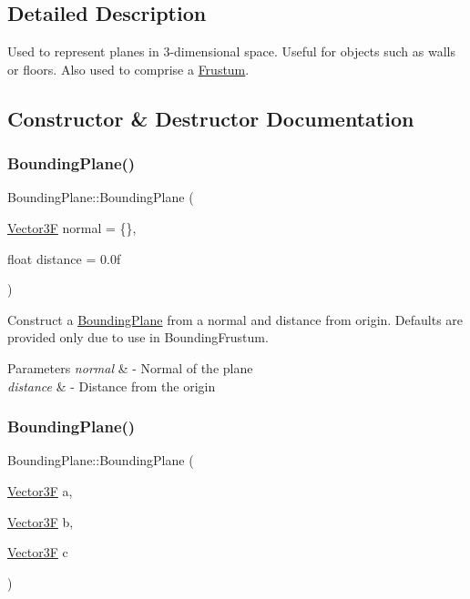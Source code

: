 \subsection{Detailed Description}
Used to represent planes in 3-\/dimensional space. Useful for objects such as walls or floors. Also used to comprise a \mbox{\hyperlink{class_frustum}{Frustum}}. 

\subsection{Constructor \& Destructor Documentation}
\mbox{\label{class_bounding_plane_ad25000eaea20874698ae4b40bb84fb41}} 
\subsubsection{\texorpdfstring{Bounding\+Plane()}{BoundingPlane()}\hspace{0.1cm}{\footnotesize\ttfamily [1/2]}}
{\footnotesize\ttfamily Bounding\+Plane\+::\+Bounding\+Plane (\begin{DoxyParamCaption}\item[{\mbox{\hyperlink{class_vector3}{Vector3F}}}]{normal = {\ttfamily \{\}},  }\item[{float}]{distance = {\ttfamily 0.0f} }\end{DoxyParamCaption})}

Construct a \mbox{\hyperlink{class_bounding_plane}{Bounding\+Plane}} from a normal and distance from origin. Defaults are provided only due to use in Bounding\+Frustum. 
\begin{DoxyParams}{Parameters}
{\em normal} & -\/ Normal of the plane \\
\hline
{\em distance} & -\/ Distance from the origin \\
\hline
\end{DoxyParams}
\mbox{\label{class_bounding_plane_a24495ff7c5819bb37af4e971a077b7dd}} 
\subsubsection{\texorpdfstring{Bounding\+Plane()}{BoundingPlane()}\hspace{0.1cm}{\footnotesize\ttfamily [2/2]}}
{\footnotesize\ttfamily Bounding\+Plane\+::\+Bounding\+Plane (\begin{DoxyParamCaption}\item[{\mbox{\hyperlink{class_vector3}{Vector3F}}}]{a,  }\item[{\mbox{\hyperlink{class_vector3}{Vector3F}}}]{b,  }\item[{\mbox{\hyperlink{class_vector3}{Vector3F}}}]{c }\end{DoxyParamCaption})}

